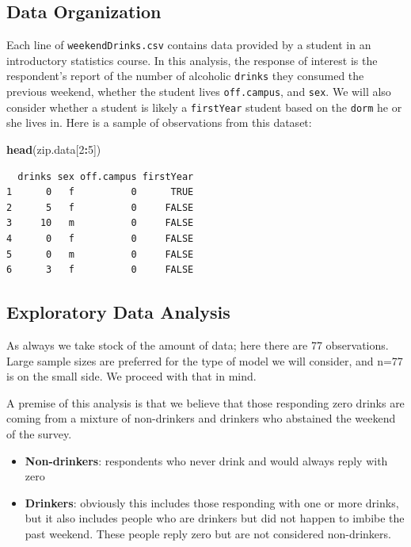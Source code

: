 \documentclass[
]{krantz}
\newenvironment{Shaded}{\begin{snugshade}}{\end{snugshade}}
\newcommand{\DecValTok}[1]{\textcolor[rgb]{0.06,0.06,0.06}{#1}}
\newcommand{\KeywordTok}[1]{\textcolor[rgb]{0.27,0.27,0.27}{\textbf{#1}}}
\newcommand{\NormalTok}[1]{#1}
\newcommand{\OperatorTok}[1]{\textcolor[rgb]{0.43,0.43,0.43}{\textbf{#1}}}
\providecommand{\tightlist}{%
  \setlength{\itemsep}{0pt}\setlength{\parskip}{0pt}}
\begin{document}
\hypertarget{data-organization-2}{%
\subsection{Data Organization}\label{data-organization-2}}

Each line of \texttt{weekendDrinks.csv} contains data provided by a student in an introductory statistics course. In this analysis, the response of interest is the respondent's report of the number of alcoholic \texttt{drinks} they consumed the previous weekend, whether the student lives \texttt{off.campus}, and \texttt{sex}. We will also consider whether a student is likely a \texttt{firstYear} student based on the \texttt{dorm} he or she lives in. Here is a sample of observations from this dataset:

\begin{Shaded}
\begin{Highlighting}[]
\KeywordTok{head}\NormalTok{(zip.data[}\DecValTok{2}\OperatorTok{:}\DecValTok{5}\NormalTok{])}
\end{Highlighting}
\end{Shaded}

\begin{verbatim}
  drinks sex off.campus firstYear
1      0   f          0      TRUE
2      5   f          0     FALSE
3     10   m          0     FALSE
4      0   f          0     FALSE
5      0   m          0     FALSE
6      3   f          0     FALSE
\end{verbatim}

\hypertarget{exploratory-data-analysis-1}{%
\subsection{Exploratory Data Analysis}\label{exploratory-data-analysis-1}}

As always we take stock of the amount of data; here there are 77 observations. Large sample sizes are preferred for the type of model we will consider, and n=77 is on the small side. We proceed with that in mind.

A premise of this analysis is that we believe that those responding zero drinks are coming from a mixture of non-drinkers and drinkers who abstained the weekend of the survey.

\begin{itemize}
\tightlist
\item
  \textbf{Non-drinkers}: respondents who never drink and would always reply with zero
\item
  \textbf{Drinkers}: obviously this includes those responding with one or more drinks, but it also includes people who are drinkers but did not happen to imbibe the past weekend. These people reply zero but are not considered non-drinkers.
\end{itemize}
\end{document}
